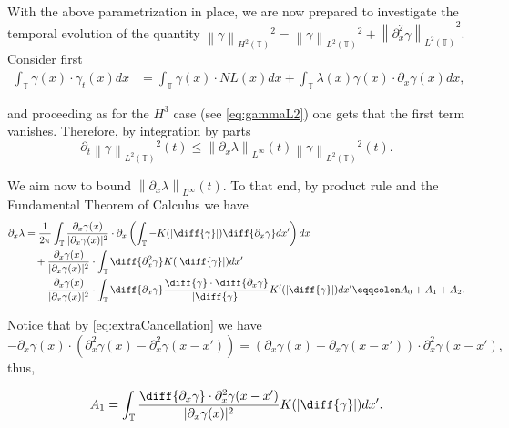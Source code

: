 \documentclass[a4paper]{amsart}
\theoremstyle{definition}
\newcommand{\T}{\ensuremath{\mathbb{T}}}
\newcommand{\Np}[2][\infty]{\ensuremath{\left\|#2\right\|_{L^#1}}}
\newcommand{\Lp}[2][2]{\ensuremath{\left\|#2\right\|_{L^#1(\T)}}}
\newcommand{\Hd}[1]{\ensuremath{\left\|#1\right\|_{H^2(\T)}}}
\newcommand{\intT}{\ensuremath{\int_\T}}
\begin{document}
    With the above parametrization in place, we are now prepared to investigate the temporal evolution of the quantity $\Hd{\gamma}^2 = \Lp{\gamma}^2 + \Lp{\partial_x^2 \gamma}^2.$
    Consider first
    \begin{equation}
    \begin{aligned}
        \int_\T \gamma(x)\cdot\gamma_t(x)dx &= \int_\T \gamma(x) \cdot NL(x) dx + \intT \lambda(x)\gamma(x)\cdot\partial_x\gamma(x) dx,
    \end{aligned}
    \end{equation}

    and  proceeding as for the $H^3$ case (see \eqref{eq:gammaL2}) one gets that the first term vanishes. Therefore, by integration by parts 
    \begin{equation}\label{eq:H2L2}
        \partial_t \Lp{\gamma}^2(t)\leq \Np{\partial_x \lambda}(t)\Lp{\gamma}^2(t).
    \end{equation}
    

    We aim now to bound $\Np{\partial_x \lambda}(t)$. To that end, by product rule and the Fundamental Theorem of Calculus we have 
    \begin{align*}
        \partial_x \lambda &= \frac{1}{2\pi} \int_\T \frac{\partial_x \gamma(x)}{|\partial_x\gamma(x)|^2} \cdot \partial_x\left(\intT -K(|\diff{\gamma}|) \diff{\partial_x\gamma} dx'\right) dx\\&\quad+\frac{\partial_x\gamma(x)}{|\partial_x\gamma(x)|^2} \cdot\intT \diff{\partial_x^2\gamma} K(|\diff{\gamma}|)dx'\\&\quad-\frac{\partial_x\gamma(x)}{|\partial_x\gamma(x)|^2} \cdot\intT \diff{\partial_x\gamma }\frac{\diff{\gamma}\cdot\diff{\partial_x\gamma}}{|\diff{\gamma}|}K'(|\diff{\gamma}|)dx'\eqqcolon A_0+A_1+A_2.
    \end{align*}

    Notice that by \eqref{eq:extraCancellation} we have $$-\partial_x\gamma(x)\cdot(\partial_x^2\gamma(x)-\partial_x^2\gamma(x-x'))=(\partial_x\gamma(x)-\partial_x\gamma(x-x'))\cdot\partial_x^2\gamma(x-x'),$$ thus,

    $$A_1=\intT \frac{\diff{\partial_x \gamma}\cdot \partial_x^2\gamma (x-x')}{|\partial_x\gamma(x)|^2} K(|\diff{\gamma}|)dx'.$$
\end{document}
